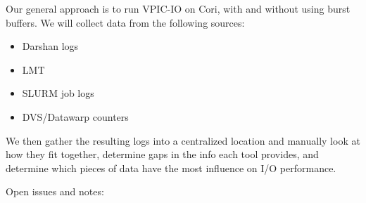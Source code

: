 \documentclass[conference,10pt,compsocconf]{IEEEtran}
\begin{document}
Our general approach is to run VPIC-IO on Cori, with and without using
burst buffers. We will collect data from the following sources:

\begin{itemize}
\item Darshan logs
\item LMT
\item SLURM job logs
\item DVS/Datawarp counters
\end{itemize}

We then gather the resulting logs into a centralized location and manually
look at how they fit together, determine gaps in the info each tool provides,
and determine which pieces of data have the most influence on I/O performance.

Open issues and notes:
\end{document}
